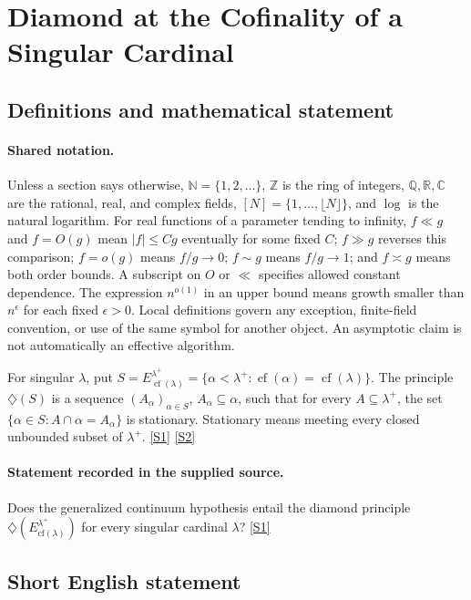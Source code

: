 \documentclass[11pt,a4paper]{article}
\newcommand{\N}{\mathbb{N}}
\newcommand{\Z}{\mathbb{Z}}
\newcommand{\Q}{\mathbb{Q}}
\newcommand{\R}{\mathbb{R}}
\newcommand{\C}{\mathbb{C}}
\newcommand{\sref}[2]{\hyperlink{source:#1:#2}{[S#2]}}
\begin{document}
\section{Diamond at the Cofinality of a Singular Cardinal}\label{statement}


\subsection{Definitions and mathematical statement}

\paragraph{Shared notation.}Unless a section says otherwise, $\N=\{1,2,\ldots\}$,
$\Z$ is the ring of integers, $\Q,\R,\C$ are the rational, real, and complex
fields, $[N]=\{1,\ldots,\lfloor N\rfloor\}$, and $\log$ is the natural
logarithm. For real functions of a parameter tending to infinity,
$f\ll g$ and $f=O(g)$ mean $|f|\leq Cg$ eventually for some fixed $C$;
$f\gg g$ reverses this comparison; $f=o(g)$ means $f/g\to0$;
$f\sim g$ means $f/g\to1$; and $f\asymp g$ means both order bounds.
A subscript on $O$ or $\ll$ specifies allowed constant dependence.
The expression $n^{o(1)}$ in an upper bound means growth smaller than
$n^\epsilon$ for each fixed $\epsilon>0$. Local definitions govern any
exception, finite-field convention, or use of the same symbol for another
object. An asymptotic claim is not automatically an effective algorithm.



For singular $\lambda$, put $S=E_{\operatorname{cf}(\lambda)}^{\lambda^+}=\{\alpha<\lambda^+:\operatorname{cf}(\alpha)=\operatorname{cf}(\lambda)\}$. The principle $\diamondsuit(S)$ is a sequence $(A_\alpha)_{\alpha\in S}$, $A_\alpha\subseteq\alpha$, such that for every $A\subseteq\lambda^+$, the set $\{\alpha\in S:A\cap\alpha=A_\alpha\}$ is stationary. Stationary means meeting every closed unbounded subset of $\lambda^+$. \sref{statement}{1} \sref{statement}{2}

\paragraph{Statement recorded in the supplied source.}
Does the generalized continuum hypothesis entail the diamond principle $\diamondsuit(E_{\text{cf}(\lambda)}^{\lambda^+})$ for every singular cardinal $\lambda$? \sref{statement}{1}

\subsection{Short English statement}
\end{document}
